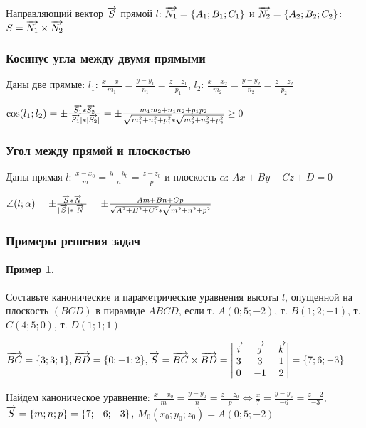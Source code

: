 \documentclass{article}
\def\vec{\ensuremath\overrightarrow}
\begin{document}
\begin{flushleft}
Направляющий вектор $\vec{S}$ прямой $l$: $\vec{N_1} = \{ A_1; B_1; C_1 \}$ и $\vec{N_2} = \{ A_2; B_2; C_2 \}$: $S = \vec{N_1} \times \vec{N_2}$

\subsubsection{Косинус угла между двумя прямыми}

Даны две прямые: $l_1$: $\frac{x - x_1}{m_1} = \frac{y - y_1}{n_1} = \frac{z - z_1}{p_1}$, $l_2$: $\frac{x - x_2}{m_2} = \frac{y - y_2}{n_2} = \frac{z - z_2}{p_2}$

$\cos (l_1; l_2) = \pm \frac{\vec{S_1} * \vec{S_2}}{|\vec{S_1}| * |\vec{S_2}|} = \pm \frac{m_1 m_2 + n_1 n_2 + p_1 p_2}{\sqrt{m_1^2 + n_1^2 + p_1^2} * \sqrt{m_2^2 + n_2^2 + p_2^2}} \ge 0$

\subsubsection{Угол между прямой и плоскостью}

Даны прямая $l$: $\frac{x - x_0}{m} = \frac{y - y_0}{n} = \frac{z - z_0}{p}$ и плоскость $\alpha$: $Ax + By + C z + D = 0$

$\angle (l; \alpha) = \pm \frac{\vec{S} * \vec{N}}{|\vec{S}| * |\vec{N}|} = \pm \frac{A m + B n + C p}{\sqrt{A^2 + B^2 + C^2} * \sqrt{m^2 + n ^2 + p^2}}$

\subsubsection{Примеры решения задач}

\paragraph{Пример 1.} Составьте канонические и параметрические уравнения высоты $l$, опущенной на плоскость $(B C D)$ в пирамиде $A B C D$, если т. $A(0; 5; -2)$, т. $B(1; 2; -1)$, т. $C(4; 5; 0)$, т. $D(1; 1; 1)$

$\vec{BC} = \{ 3; 3; 1 \}, \vec{B D} = \{ 0; -1; 2 \}, \vec{S} = \vec{BC} \times \vec{B D} = \begin{vmatrix}
    \vec{i} & \vec{j} & \vec{k} \\
    3 & 3 & 1 \\
    0 & -1 & 2
\end{vmatrix} = \{ 7; 6; -3 \}$

Найдем каноническое уравнение: $\frac{x - x_0}{m} = \frac{y - y_0}{n} = \frac{z - z_0}{p} \Longleftrightarrow \frac{x}{7} = \frac{y - y_5}{-6} = \frac{z + 2}{-3}$, $\vec{S} = \{ m; n; p \} = \{ 7; -6; -3 \}$, $M_0(x_0; y_0; z_0) = A(0; 5; -2)$


\end{flushleft}
\end{document}
